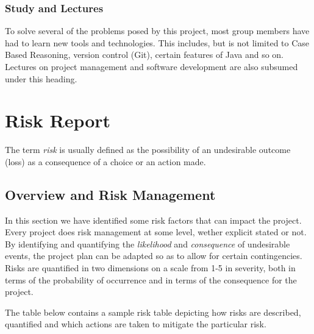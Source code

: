\subsubsection{Study and Lectures}
To solve several of the problems posed by this project, most group members have had to learn new tools and technologies. This includes, but is not limited to Case Based Reasoning, version control (Git), certain features of Java and so on. Lectures on project management  and software development are also subsumed under this heading.

\section{Risk Report}\label{riskReport}
The term \emph{risk} is usually defined as the possibility of an undesirable outcome (loss) as a consequence of a choice or an action made. 


\subsection{Overview and Risk Management}
In this section we have identified some risk factors that can impact the project. Every project does risk management at some level, wether explicit stated or not. By identifying and quantifying the \emph{likelihood} and \emph{consequence} of undesirable events, the project plan can be adapted so as to allow for certain contingencies. Risks are quantified in two dimensions on a scale from 1-5 in severity, both in terms of the probability of occurrence and in terms of the consequence for the project.

The table below contains a sample risk table depicting how risks are described, quantified and which actions are taken to mitigate the particular risk. 


